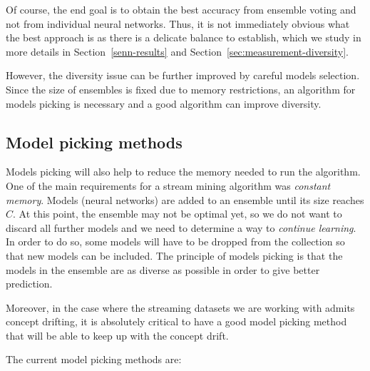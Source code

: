 \documentclass[conference]{IEEEtran}
\begin{document}
		Of course, the end goal is to obtain the best accuracy from ensemble voting and not from individual neural networks. Thus, it is not immediately obvious what the best approach is as there is a delicate balance to establish, which we study in more details in Section~\ref{senn-results} and Section~\ref{sec:measurement-diversity}.
		
		However, the diversity issue can be further improved by careful models selection. Since the size of ensembles is fixed due to memory restrictions, an algorithm for models picking is necessary and a good algorithm can improve diversity.
		
		\subsection{Model picking methods}
		\label{sec:model-picking}
				
		Models picking will also help to reduce the memory needed to run the algorithm. One of the main requirements for a stream mining algorithm was \emph{constant memory}. Models (neural networks) are added to an ensemble until its size reaches $C$. At this point, the ensemble may not be optimal yet, so we do not want to discard all further models and we need to determine a way to \emph{continue learning}. In order to do so, some models will have to be dropped from the collection so that new models can be included. The principle of models picking is that the models in the ensemble are as diverse as possible in order to give better prediction. 
		
		Moreover, in the case where the streaming datasets we are working with admits concept drifting, it is absolutely critical	to have a good model picking method that will be able to keep up with the concept drift.
		
		The current model picking methods are:
\end{document}
